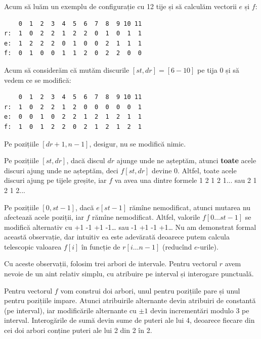 Acum să luăm un exemplu de configurație cu 12 tije și să calculăm vectorii $e$ și $f$:

\begin{verbatim}
    0  1  2  3  4  5  6  7  8  9 10 11
r:  1  0  2  2  1  2  2  0  1  0  1  1
e:  1  2  2  2  0  1  0  0  2  1  1  1
f:  0  1  0  0  1  1  2  0  2  2  0  0
\end{verbatim}

Acum să considerăm că mutăm discurile $[st, dr] = [6-10]$ pe tija 0 și să vedem ce se modifică:

\begin{verbatim}
    0  1  2  3  4  5  6  7  8  9 10 11
r:  1  0  2  2  1  2  0  0  0  0  0  1
e:  0  0  1  0  2  2  1  2  1  2  1  1
f:  1  0  1  2  2  0  2  1  2  1  2  1
\end{verbatim}

Pe pozițiile $[dr+1, n-1]$, desigur, nu se modifică nimic.

Pe pozițiile $[st, dr]$, dacă discul $dr$ ajunge unde ne așteptăm, atunci \textbf{toate} acele discuri ajung unde ne așteptăm, deci $f[st, dr]$ devine 0. Altfel, toate acele discuri ajung pe tijele greșite, iar $f$ va avea una dintre formele 1 2 1 2 1... sau 2 1 2 1 2...

Pe pozițiile $[0,st-1]$, dacă $e[st-1]$ rămîne nemodificat, atunci mutarea nu afectează acele poziții, iar $f$ rămîne nemodificat. Altfel, valorile $f[0 \dots st-1]$ se modifică alternativ cu +1 -1 +1 -1… sau -1 +1 -1 +1… Nu am demonstrat formal această observație, dar intuitiv ea este adevărată deoarece putem calcula telescopic valoarea $f[i]$ în funcție de $r[i \dots n - 1]$ (reducînd $e$-urile).

Cu aceste observații, folosim trei arbori de intervale. Pentru vectorul $r$ avem nevoie de un aint relativ simplu, cu atribuire pe interval și interogare punctuală.

Pentru vectorul $f$ vom construi doi arbori, unul pentru pozițiile pare și unul pentru pozițiile impare. Atunci atribuirile alternante devin atribuiri de constantă (pe interval), iar modificările alternante cu $\pm 1$ devin incrementări modulo 3 pe interval. Interogările de sumă devin sume de puteri ale lui 4, deoarece fiecare din cei doi arbori conține puteri ale lui 2 din 2 în 2.
